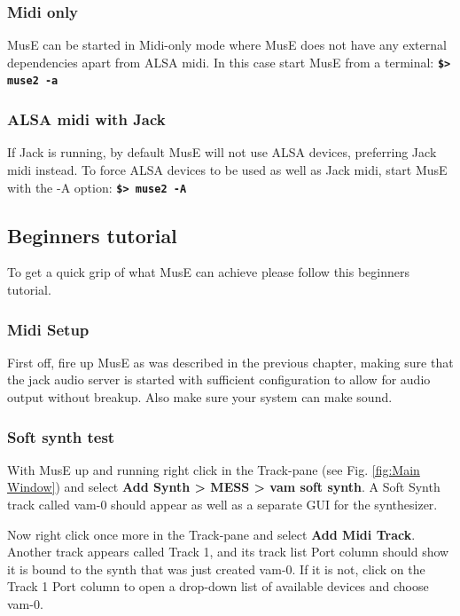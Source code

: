 \documentclass[a4paper]{report}
\newcommand{\shell}[1]{\texttt{\textbf{#1}}}
\newcommand{\menu}[1]{\textbf{#1}}
\begin{document}
\subsubsection{Midi only}
MusE can be started in Midi-only mode where MusE does not have any external
dependencies apart from ALSA midi. In this case start MusE from a terminal:
\shell{\$> muse2 -a}

\subsubsection{ALSA midi with Jack}
If Jack is running, by default MusE will not use ALSA devices, preferring
Jack midi instead. To force ALSA devices to be used as well as Jack
midi, start MusE with the -A option: \shell{\$> muse2 -A}

\subsection{Beginners tutorial}
To get a quick grip of what MusE can achieve please follow this beginners
tutorial.
\subsubsection{Midi Setup}
First off, fire up MusE as was described in the previous chapter, making
sure that the jack audio server is started with sufficient configuration
to allow for audio output without breakup. Also make sure your system can
make sound. 
\subsubsection{Soft synth test}
With MusE up and running right click in the Track-pane (see
Fig. \ref{fig:Main Window}) and select 
\menu{Add Synth > MESS > vam soft synth}.
A Soft Synth track called vam-0 should appear as well as a separate GUI
for the synthesizer.

Now right click once more in the Track-pane and select \menu{Add Midi
Track}. Another track appears called Track 1, and its track list Port
column should show it is bound to the synth that was just created vam-0.
If it is not, click on the Track 1 Port column to open a drop-down list
of available devices and choose vam-0.
\end{document}
